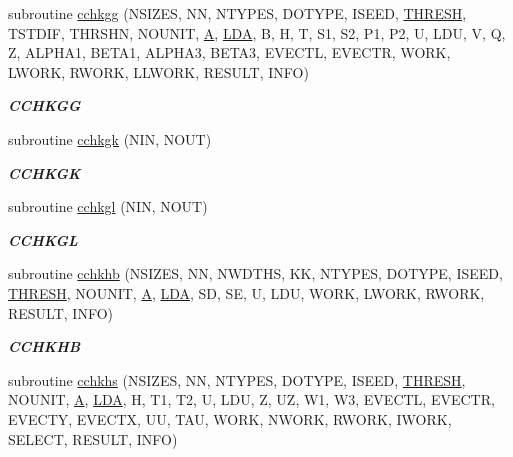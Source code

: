 \begin{DoxyCompactItemize}
subroutine \hyperlink{group__complex__eig_ga712d308fd40a2f0f279fe4a0c8544a30}{cchkgg} (N\+S\+I\+Z\+E\+S, N\+N, N\+T\+Y\+P\+E\+S, D\+O\+T\+Y\+P\+E, I\+S\+E\+E\+D, \hyperlink{zlaqgs_8c_a0656018abfc9fa2821827415f5d5ea57}{T\+H\+R\+E\+S\+H}, T\+S\+T\+D\+I\+F, T\+H\+R\+S\+H\+N, N\+O\+U\+N\+I\+T, \hyperlink{classA}{A}, \hyperlink{example__user_8c_ae946da542ce0db94dced19b2ecefd1aa}{L\+D\+A}, B, H, T, S1, S2, P1, P2, U, L\+D\+U, V, Q, Z, A\+L\+P\+H\+A1, B\+E\+T\+A1, A\+L\+P\+H\+A3, B\+E\+T\+A3, E\+V\+E\+C\+T\+L, E\+V\+E\+C\+T\+R, W\+O\+R\+K, L\+W\+O\+R\+K, R\+W\+O\+R\+K, L\+L\+W\+O\+R\+K, R\+E\+S\+U\+L\+T, I\+N\+F\+O)
\begin{DoxyCompactList}\small\item\em {\bfseries C\+C\+H\+K\+G\+G} \end{DoxyCompactList}\item 
subroutine \hyperlink{group__complex__eig_ga38c55aad209e2f68c34d7959912ee253}{cchkgk} (N\+I\+N, N\+O\+U\+T)
\begin{DoxyCompactList}\small\item\em {\bfseries C\+C\+H\+K\+G\+K} \end{DoxyCompactList}\item 
subroutine \hyperlink{group__complex__eig_ga38ae0be71db106e536d22d0982164f3e}{cchkgl} (N\+I\+N, N\+O\+U\+T)
\begin{DoxyCompactList}\small\item\em {\bfseries C\+C\+H\+K\+G\+L} \end{DoxyCompactList}\item 
subroutine \hyperlink{group__complex__eig_ga392b1b165355ea949383c3c5f701b0e1}{cchkhb} (N\+S\+I\+Z\+E\+S, N\+N, N\+W\+D\+T\+H\+S, K\+K, N\+T\+Y\+P\+E\+S, D\+O\+T\+Y\+P\+E, I\+S\+E\+E\+D, \hyperlink{zlaqgs_8c_a0656018abfc9fa2821827415f5d5ea57}{T\+H\+R\+E\+S\+H}, N\+O\+U\+N\+I\+T, \hyperlink{classA}{A}, \hyperlink{example__user_8c_ae946da542ce0db94dced19b2ecefd1aa}{L\+D\+A}, S\+D, S\+E, U, L\+D\+U, W\+O\+R\+K, L\+W\+O\+R\+K, R\+W\+O\+R\+K, R\+E\+S\+U\+L\+T, I\+N\+F\+O)
\begin{DoxyCompactList}\small\item\em {\bfseries C\+C\+H\+K\+H\+B} \end{DoxyCompactList}\item 
subroutine \hyperlink{group__complex__eig_gaf9958096d169e0e3ce8fb70643cec936}{cchkhs} (N\+S\+I\+Z\+E\+S, N\+N, N\+T\+Y\+P\+E\+S, D\+O\+T\+Y\+P\+E, I\+S\+E\+E\+D, \hyperlink{zlaqgs_8c_a0656018abfc9fa2821827415f5d5ea57}{T\+H\+R\+E\+S\+H}, N\+O\+U\+N\+I\+T, \hyperlink{classA}{A}, \hyperlink{example__user_8c_ae946da542ce0db94dced19b2ecefd1aa}{L\+D\+A}, H, T1, T2, U, L\+D\+U, Z, U\+Z, W1, W3, E\+V\+E\+C\+T\+L, E\+V\+E\+C\+T\+R, E\+V\+E\+C\+T\+Y, E\+V\+E\+C\+T\+X, U\+U, T\+A\+U, W\+O\+R\+K, N\+W\+O\+R\+K, R\+W\+O\+R\+K, I\+W\+O\+R\+K, S\+E\+L\+E\+C\+T, R\+E\+S\+U\+L\+T, I\+N\+F\+O)

\end{DoxyCompactItemize}

